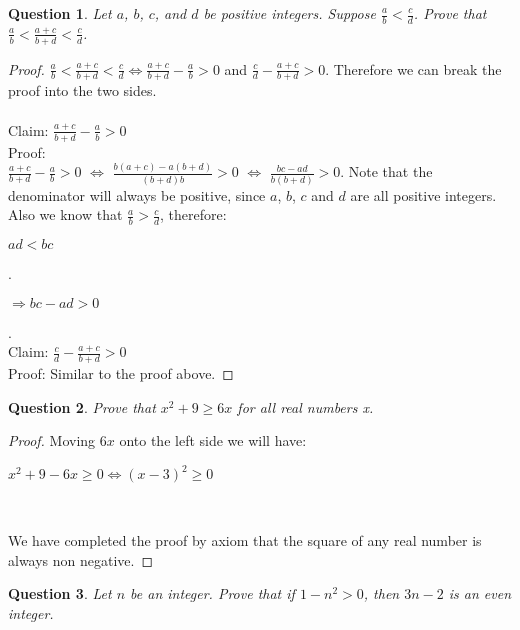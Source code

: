 \documentclass[11pt,oneside]{article}
\newtheorem{question}{Question}
\begin{document}
\bigskip

\begin{question}
    Let $a$, $b$, $c$, and $d$ be positive integers. Suppose $\frac{a}{b} < \frac{c}{d}$. Prove that $\frac{a}{b} < \frac{a+c}{b+d} < \frac{c}{d}$.\\
\end{question}

\begin{proof}
   $\frac{a}{b}<\frac{a+c}{b+d}<\frac{c}{d} \iff \frac{a+c}{b+d} - \frac{a}{b} > 0$ and $\frac{c}{d} - \frac{a+c}{b+d} > 0$. Therefore we can break the proof into the two sides. \\
   \\
   Claim: $\frac{a+c}{b+d} - \frac{a}{b} > 0$ \\
   Proof: \\
    $\frac{a+c}{b+d} - \frac{a}{b} > 0$ $\iff$ $\frac{b(a+c)-a(b+d)}{(b+d)b} > 0$ $\iff$ $\frac{bc-ad}{b(b+d)} > 0$.
   Note that the denominator will always be positive, since $a$, $b$, $c$ and $d$ are all positive integers. Also we know that $\frac{a}{b} > \frac{c}{d}$, therefore: \\
   \centerline{$ad < bc$}.
   \centerline{$\Rightarrow bc - ad > 0$}.
   \\
   Claim: $\frac{c}{d} - \frac{a+c}{b+d} > 0$ \\
   Proof: Similar to the proof above.
   
\end{proof}

\newpage

\begin{question}
    Prove that $x^2 + 9 \geq 6x$ for all real numbers x.
\end{question}

\begin{proof}
    Moving $6x$ onto the left side we will have: \\
    
    \centerline{$x^2 + 9 - 6x \geq 0 \iff
    	(x-3)^2 \geq 0$}\

    We have completed the proof by axiom that the square of any real number is always non negative.   
    
\end{proof}

\bigskip

\begin{question}
    Let $n$ be an integer. Prove that if $1 - n^2 > 0$, then $3n - 2$ is an even integer.
\end{question}
\end{document}
